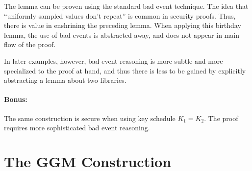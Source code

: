 \documentclass[11pt,letterpaper]{article}
\newcommand{\key}{K}
\begin{document}
The lemma can be proven using the standard bad event technique.
The idea that ``uniformly sampled values don't repeat'' is common in security proofs.
Thus, there is value in enshrining the preceding lemma.
When applying this birthday lemma, the use of bad events is abstracted away, and does not appear in  main flow of the proof.

In later examples, however, bad event reasoning is more subtle and more specialized to the proof at hand, and thus there is less to be gained by explicitly abstracting a lemma about two libraries.


\paragraph{Bonus:}
The same construction is secure when using key schedule $\key_1 = \key_2$.
The proof requires more sophisticated bad event reasoning.





\section{The GGM Construction}
\end{document}
